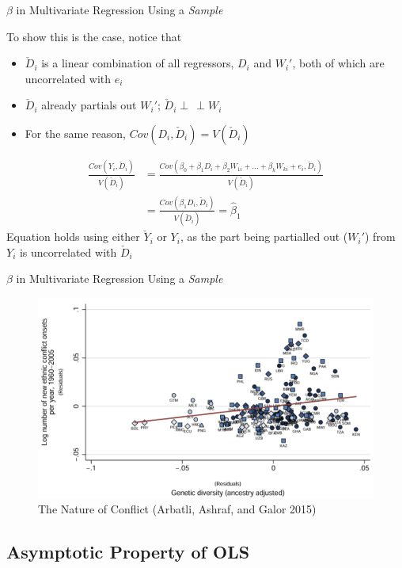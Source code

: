 \documentclass[aspectratio=1610,12pt,xcolor=dvipsnames]{beamer}
\newcommand{\indep}{\perp\!\!\!\, \perp}
\begin{document}
\begin{frame}{$\beta$ in Multivariate Regression Using a \textit{Sample}}

To show this is the case, notice that 
\begin{itemize}
    \item $\check{D}_i$ is a linear combination of all regressors, $D_i$ and $W_i'$, both of which are uncorrelated with $e_i$
    \item $\check{D}_i$ already partials out $W_i'$; $\check{D}_i \indep W_i$
    \item For the same reason, $Cov(D_i,\check{D}_i) = V(\check{D}_i)$
\end{itemize}
\begin{align*}
    \frac{Cov(Y_i,\check{D}_i)}{V(\check{D}_i)} &= \frac{Cov(\beta_0 + \beta_1 D_i + \beta_2 W_{1i} + ... + \beta_k W_{ki} + e_i,\check{D}_i)}{V(\check{D}_i)} \\
    &= \frac{Cov(\beta_1 D_i,\check{D}_i)}{V(\check{D}_i)}
    = \hat \beta_1
\end{align*}\pause
Equation holds using either $\check{Y}_i$ or $Y_i$, as the part being partialled out ($W_i'$) from $Y_i$ is uncorrelated with $\check{D}_i$
\end{frame}

\begin{frame}{$\beta$ in Multivariate Regression Using a \textit{Sample}}

    \begin{figure}
        \centering
        \includegraphics[width=0.75\linewidth]{Linear Regression/Figures/FWL_example.png}
        \caption{The Nature of Conflict (Arbatli, Ashraf, and Galor 2015)}
        \label{fig:placeholder}
    \end{figure}
\end{frame}

\subsection*{Asymptotic Property of OLS}
\end{document}
